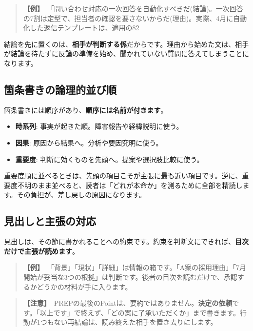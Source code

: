 \documentclass{article}
\begin{document}
\begin{quote}
\textbf{【例】}\ 「問い合わせ対応の一次回答を自動化すべきだ(結論)。一次回答の7割は定型で、担当者の確認を要さないからだ(理由)。実際、4月に自動化した返信テンプレートは、適用の82%
\end{quote}

結論を先に置くのは、\textbf{相手が判断する係}だからです。理由から始めた文は、相手が結論を待たずに反論の準備を始め、聞かれていない質問に答えてしまうことになります。

\subsection{箇条書きの論理的並び順}

箇条書きには順序があり、\textbf{順序には名前が付きます}。

\begin{itemize}
\item \textbf{時系列}: 事実が起きた順。障害報告や経緯説明に使う。
\item \textbf{因果}: 原因から結果へ。分析や要因究明に使う。
\item \textbf{重要度}: 判断に効くものを先頭へ。提案や選択肢比較に使う。
\end{itemize}

重要度順に並べるときは、先頭の項目こそが主張に最も近い項目です。逆に、重要度不明のまま並べると、読者は「どれが本命か」を測るために全部を精読します。その負担が、差し戻しの原因になります。

\subsection{見出しと主張の対応}

見出しは、その節に書かれることへの約束です。約束を判断文にできれば、\textbf{目次だけで主張が読めます}。

\begin{quote}
\textbf{【例】}\ 「背景」「現状」「詳細」は情報の箱です。「A案の採用理由」「7月開始が妥当な3つの根拠」は判断です。後者の目次を読むだけで、承認するかどうかの材料が手に入ります。
\end{quote}

\begin{quote}
\textbf{【注意】}\ PREPの最後のPointは、要約ではありません。\textbf{決定の依頼}です。「以上です」で終えず、「どの案に了承いただくか」まで書きます。行動が1つもない再結論は、読み終えた相手を置き去りにします。
\end{quote}
\end{document}
